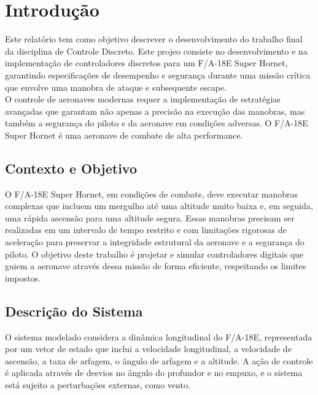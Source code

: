 \documentclass[a4paper, 12pt]{article}
\begin{document}
\newpage


\newpage

\listoffigures
\thispagestyle{empty}

\newpage

\newpage

\thispagestyle{empty}

\newpage

\section{Introdução}
Este relatório tem como objetivo descrever o desenvolvimento do trabalho final da disciplina de Controle Discreto. Este projeo consiste no desenvolvimento e na implementação de controladores discretos para um F/A-18E Super Hornet, garantindo especificações de desempenho e segurança durante uma missão crítica que envolve uma manobra de ataque e subsequente escape.\\
O controle de aeronaves modernas requer a implementação de estratégias avançadas que garantam não apenas a precisão na execução das manobras, mas também a segurança do piloto e da aeronave em condições adversas. O F/A-18E Super Hornet é uma aeronave de combate de alta performance. 

\subsection{Contexto e Objetivo}
O F/A-18E Super Hornet, em condições de combate, deve executar manobras complexas que incluem um mergulho até uma altitude muito baixa e, em seguida, uma rápida ascensão para uma altitude segura. Essas manobras precisam ser realizadas em um intervalo de tempo restrito e com limitações rigorosas de aceleração para preservar a integridade estrutural da aeronave e a segurança do piloto. O objetivo deste trabalho é projetar e simular controladores digitais que guiem a aeronave através dessa missão de forma eficiente, respeitando os limites impostos.

\subsection{Descrição do Sistema}
O sistema modelado considera a dinâmica longitudinal do F/A-18E, representada por um vetor de estado que inclui a velocidade longitudinal, a velocidade de ascensão, a taxa de arfagem, o ângulo de arfagem e a altitude. A ação de controle é aplicada através de desvios no ângulo do profundor e no empuxo, e o sistema está sujeito a perturbações externas, como vento.\\
\end{document}

